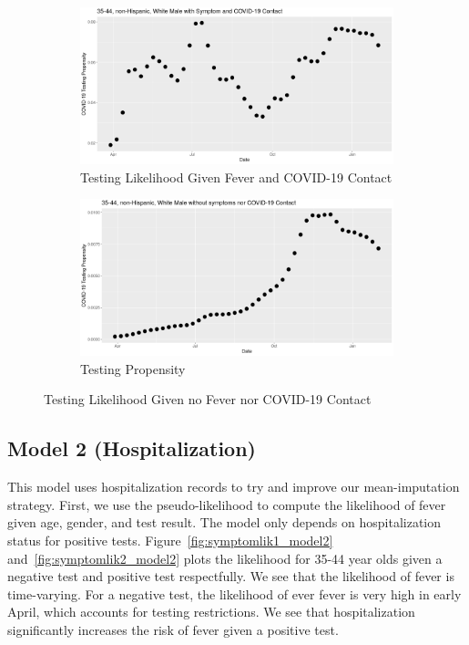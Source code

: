 \documentclass[11pt]{amsart}
\numberwithin{equation}{section}
\theoremstyle{plain}
\begin{document}
\begin{figure}[!th]
\centering
\begin{subfigure}{.5\textwidth}
 \centering
 \includegraphics[width=.9\linewidth]{../figs/tvprop_fig1.png}
 \caption{Testing Likelihood Given Fever and COVID-19 Contact}
 \label{fig:testinglik1}
\end{subfigure}%
\begin{subfigure}{.5\textwidth}
 \centering
\includegraphics[width=.9\linewidth]{../figs/tvprop_fig2.png}
 \caption{Testing Propensity}
 \label{fig:testinglik2}
\end{subfigure}
\caption{Testing Likelihood Given no Fever nor COVID-19 Contact}
\label{fig:testinglik}
\end{figure}

\newpage

\subsection{Model 2 (Hospitalization)}

This model uses hospitalization records to try and improve our mean-imputation strategy.  First, we use the pseudo-likelihood to compute the likelihood of fever given age, gender, and test result.  The model only depends on hospitalization status for positive tests.  Figure~\ref{fig:symptomlik1_model2} and~\ref{fig:symptomlik2_model2} plots the likelihood for 35-44 year olds given a negative test and positive test respectfully.  We see that the likelihood of fever is time-varying.  For a negative test, the likelihood of ever fever is very high in early April, which accounts for testing restrictions. We see that hospitalization significantly increases the risk of fever given a positive test.
\end{document}
